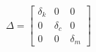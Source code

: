 \documentclass[a4paper,12pt]{article}
\begin{document}
			\[
			\Delta = 
			\begin{bmatrix}
			\delta_{k} & 0 & 0\\
			0 & \delta_{c} & 0\\
			0 & 0 & \delta_{m}
			\end{bmatrix}
			\]
%				
%			
\end{document}
